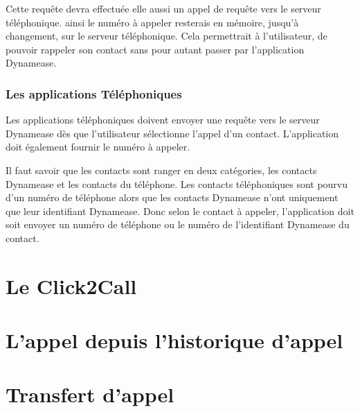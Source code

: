 Cette requête devra effectuée elle aussi un appel de requête vers le serveur téléphonique. ainsi le numéro à appeler resterais en mémoire, jusqu'à changement, sur le serveur téléphonique. Cela permettrait à l'utilisateur, de pouvoir rappeler son contact sans pour autant passer par l'application Dynamease.

\subsubsection{Les applications Téléphoniques}

Les applications téléphoniques doivent envoyer une requête vers le serveur Dynamease dès que l'utilisateur sélectionne l'appel d'un contact. L'application doit également fournir le numéro à appeler.

Il faut savoir que les contacts sont ranger en deux catégories, les contacts Dynamease et les contacts du téléphone. Les contacts téléphoniques sont pourvu d'un numéro de téléphone alors que les contacts Dynamease n'ont uniquement que leur identifiant Dynamease. Donc selon le contact à appeler, l'application doit soit envoyer un numéro de téléphone ou le numéro de l'identifiant Dynamease du contact.

\section{Le Click2Call}

\section{L'appel depuis l'historique d'appel}

\section{Transfert d'appel}